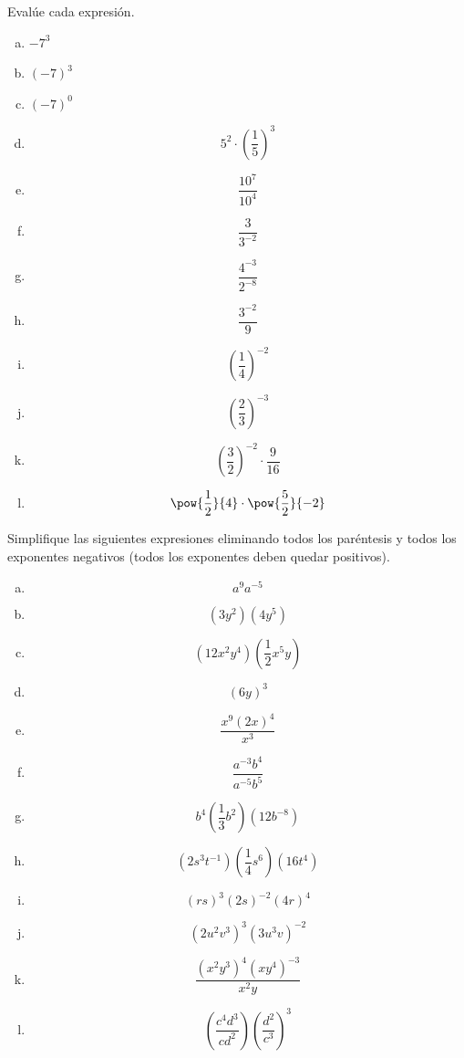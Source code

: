\documentclass[11pt]{article}
\begin{document}
\begin{exercise}
Evalúe cada expresión.
\begin{multicols}{5}
\begin{enumerate}[a)]
\item $-7^3$
\item $(-7)^3$
\item $(-7)^0$
\item \[ 5^2 \cdot \left(\frac{1}{5}\right)^3 \]
\item \[ \frac{10^7}{10^4} \]
\item \[ \frac{3}{3^{-2}} \]
\item \[ \frac{4^{-3}}{2^{-8}} \]
\item \[ \frac{3^{-2}}{9} \]
\item \[ \left(\frac{1}{4}\right)^{-2} \]
\item \[ \left(\frac{2}{3}\right)^{-3} \]
\item \[ \left(\frac{3}{2}\right)^{-2} \cdot \frac{9}{16} \]
\item \[ \pow{\frac{1}{2}}{4} \cdot \pow{\frac{5}{2}}{-2} \]
\end{enumerate}
\end{multicols}
\end{exercise}

\begin{exercise}
Simplifique las siguientes expresiones eliminando todos los paréntesis y todos los exponentes negativos (todos los exponentes deben quedar positivos).
\begin{multicols}{3}
\begin{enumerate}[a)]
\item \[ a^9 a^{-5} \]
\item \[ (3y^2)(4y^5) \]
\item \[ (12 x^2 y^4)\left(\frac{1}{2} x^5 y\right) \]
\item \[(6y)^3 \]
\item \[ \frac{x^9 (2x)^4}{x^3} \]
\item \[ \frac{a^{-3} b^4}{a^{-5} b^5} \]
\item \[ b^4\left(\frac{1}{3} b^2\right)(12 b^{-8}) \]
\item \[ (2s^3 t^{-1})\left(\frac{1}{4}s^6\right)(16 t^ 4) \]
\item \[ (rs)^3 (2s)^{-2}(4r)^4 \]
\item \[ (2 u^2 v^3)^3 (3u^3 v)^{-2} \]
\item \[ \frac{(x^2 y^3)^4 (xy^4)^{-3}}{x^2 y} \]
\item \[ \left(\frac{c^4 d^3}{c d^2}\right) \left(\frac{d^2}{c^3}\right)^3 \]
\end{enumerate}
\end{multicols}
\end{exercise}
\end{document}
